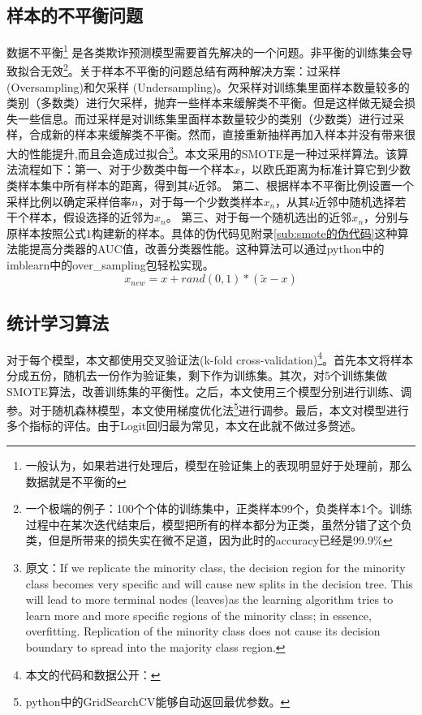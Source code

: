 \documentclass{article}
\begin{document}
\subsection{样本的不平衡问题}
\par 数据不平衡\footnote{一般认为，如果若进行处理后，模型在验证集上的表现明显好于处理前，那么数据就是不平衡的} 是各类欺诈预测模型需要首先解决的一个问题。非平衡的训练集会导致拟合无效\footnote{一个极端的例子：100个个体的训练集中，正类样本99个，负类样本1个。训练过程中在某次迭代结束后，模型把所有的样本都分为正类，虽然分错了这个负类，但是所带来的损失实在微不足道，因为此时的accuracy已经是99.9\%}。关于样本不平衡的问题总结有两种解决方案：过采样(Oversampling)和欠采样 (Undersampling)。欠采样对训练集里面样本数量较多的类别（多数类）进行欠采样，抛弃一些样本来缓解类不平衡。但是这样做无疑会损失一些信息。而过采样是对训练集里面样本数量较少的类别（少数类）进行过采样，合成新的样本来缓解类不平衡。然而，直接重新抽样再加入样本并没有带来很大的性能提升\cite{Japkowicz2000The},而且会造成过拟合\cite{Chawla2002SMOTE}\footnote{原文：If we replicate the minority class, the decision region for the minority class becomes very specific and will cause new splits in the decision tree. This will lead to more terminal nodes (leaves)as the learning algorithm tries to learn more and more specific regions of the minority class; in essence, overfitting. Replication of the minority class does not cause its decision boundary to spread into the majority class region.}。本文采用的SMOTE\cite{Chawla2002SMOTE}是一种过采样算法。该算法流程如下：第一、对于少数类中每一个样本$x$，以欧氏距离为标准计算它到少数类样本集中所有样本的距离，得到其$k$近邻。 第二、根据样本不平衡比例设置一个采样比例以确定采样倍率$n$，对于每一个少数类样本$x_n$，从其$k$近邻中随机选择若干个样本，假设选择的近邻为$x_n$。 第三、对于每一个随机选出的近邻$x_n$，分别与原样本按照公式$1$构建新的样本。具体的伪代码见附录\ref{sub:smote的伪代码}这种算法能提高分类器的AUC值，改善分类器性能。这种算法可以通过python中的imblearn中的over\_sampling包轻松实现。
\begin{equation}
    x_{new}=x+rand(0,1)*(\widetilde{x}-x)
\end{equation}

\subsection{统计学习算法}
\par 对于每个模型，本文都使用交叉验证法(k-fold cross-validation)\footnote{本文的代码和数据公开：}。首先本文将样本分成五份，随机去一份作为验证集，剩下作为训练集。其次，对5个训练集做SMOTE算法，改善训练集的平衡性。之后，本文使用三个模型分别进行训练、调参。对于随机森林模型，本文使用梯度优化法\footnote{python中的GridSearchCV能够自动返回最优参数。}进行调参。最后，本文对模型进行多个指标的评估。由于Logit回归最为常见，本文在此就不做过多赘述。
\end{document}
